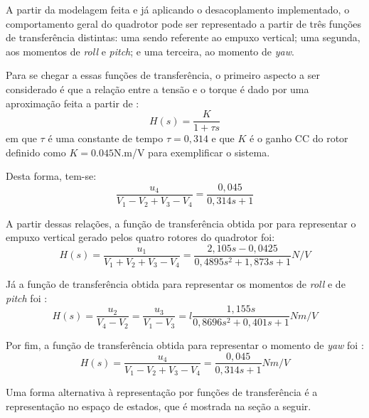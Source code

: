 A partir da modelagem feita e já aplicando o desacoplamento implementado, o comportamento geral do quadrotor pode ser representado a partir de três funções de transferência distintas: uma sendo referente ao empuxo vertical; uma segunda, aos momentos de \textit{roll} e \textit{pitch}; e uma terceira, ao momento de \textit{yaw}.

Para se chegar a essas funções de transferência, o primeiro aspecto a ser considerado é que a relação entre a tensão e o torque é dado por uma aproximação feita a partir de \cite[p.~25]{Balas2007}:
\begin{equation}
H(s)=\frac{K}{1+\tau s}
\end{equation}
em que $\tau$ é uma constante de tempo $\tau = 0,314$ e que $K$ é o ganho CC do rotor definido como $K=0.045$N.m/V para exemplificar o sistema.

Desta forma, tem-se:
\begin{equation}
\frac{u_4}{V_1-V_2+V_3-V_4} = \frac{0,045}{0,314s + 1}
\end{equation}

A partir dessas relações, a função de transferência obtida por  para representar o empuxo vertical gerado pelos quatro rotores do quadrotor foi:
\begin{equation}
H(s) = \frac{u_1}{V_1+V_2+V_3-V_4} = \frac{2,105s-0,0425}{0,4895s^2+1,873s+1} N/V
\end{equation}

Já a função de transferência obtida para representar os momentos de \textit{roll} e de \textit{pitch} foi \cite[p.~35]{Balas2007}:
\begin{equation}
H(s) = \frac{u_2}{V_4-V_2} = \frac{u_3}{V_1-V_3} = l\frac{1,155s}{0,8696s^2+0,401s+1} Nm/V
\end{equation}

Por fim, a função de transferência obtida para representar o momento de \textit{yaw} foi \cite[p.~35]{Balas2007}:
\begin{equation}
H(s) =  \frac{u_4}{V_1-V_2+V_3-V_4} = \frac{0,045}{0,314s+1} Nm/V
\end{equation}

Uma forma alternativa à representação por funções de transferência é a representação no espaço de estados, que é mostrada na seção a seguir.